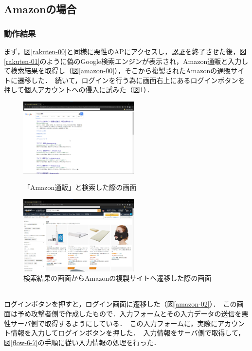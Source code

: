 \documentclass[dvipdfmx,twocolumn]{jsarticle}
\begin{document}
        \subsection{Amazonの場合}
            \subsubsection{動作結果}
                まず，図\ref{rakuten-00}と同様に悪性のAPにアクセスし，認証を終了させた後，図\ref{rakuten-01}のように偽のGoogle検索エンジンが表示され，Amazon通販と入力して検索結果を取得し（図\ref{amazon-00}），そこから複製されたAmazonの通販サイトに遷移した．\
                続いて，ログインを行う為に画面右上にあるログインボタンを押して個人アカウントへの侵入に試みた（図\ref{amazon-01}）．\
                \begin{figure}[h]
                    \centering
                    \includegraphics[width=6cm]{img/amazon/amazon-00.png}
                    \caption{「Amazon通販」と検索した際の画面}
                    \label{amazon-00}
                    \includegraphics[width=6cm]{img/amazon/amazon-01.png}
                    \caption{検索結果の画面からAmazonの複製サイトへ遷移した際の画面}
                    \label{amazon-01}
                \end{figure}
                \\
                ログインボタンを押すと，ログイン画面に遷移した（図\ref{amazon-02}）．\
                この画面は予め攻撃者側で作成したもので．入力フォームとその入力データの送信を悪性サーバ側で取得するようにしている．\
                この入力フォームに，実際にアカウント情報を入力してログインボタンを押した．\
                入力情報をサーバ側で取得して，図\ref{flow-6-7}の手順に従い入力情報の処理を行った．\
\end{document}
